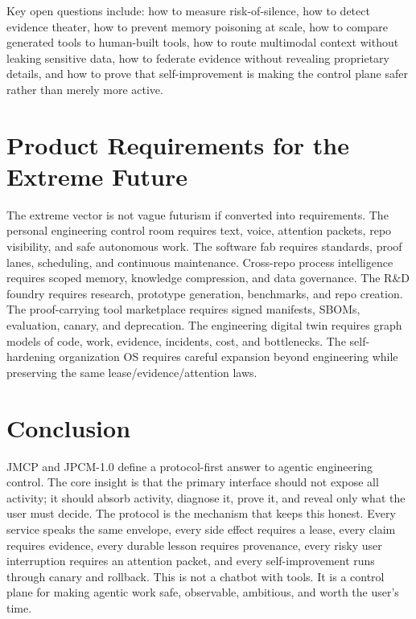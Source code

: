 \documentclass[journal,onecolumn]{IEEEtran}
\begin{document}
Key open questions include: how to measure risk-of-silence, how to detect evidence theater, how to prevent memory poisoning at scale, how to compare generated tools to human-built tools, how to route multimodal context without leaking sensitive data, how to federate evidence without revealing proprietary details, and how to prove that self-improvement is making the control plane safer rather than merely more active.

\section{Product Requirements for the Extreme Future}
The extreme vector is not vague futurism if converted into requirements. The personal engineering control room requires text, voice, attention packets, repo visibility, and safe autonomous work. The software fab requires standards, proof lanes, scheduling, and continuous maintenance. Cross-repo process intelligence requires scoped memory, knowledge compression, and data governance. The R\&D foundry requires research, prototype generation, benchmarks, and repo creation. The proof-carrying tool marketplace requires signed manifests, SBOMs, evaluation, canary, and deprecation. The engineering digital twin requires graph models of code, work, evidence, incidents, cost, and bottlenecks. The self-hardening organization OS requires careful expansion beyond engineering while preserving the same lease/evidence/attention laws.


\section{Conclusion}
JMCP and JPCM-1.0 define a protocol-first answer to agentic engineering control. The core insight is that the primary interface should not expose all activity; it should absorb activity, diagnose it, prove it, and reveal only what the user must decide. The protocol is the mechanism that keeps this honest. Every service speaks the same envelope, every side effect requires a lease, every claim requires evidence, every durable lesson requires provenance, every risky user interruption requires an attention packet, and every self-improvement runs through canary and rollback. This is not a chatbot with tools. It is a control plane for making agentic work safe, observable, ambitious, and worth the user's time.

\appendices
\end{document}
